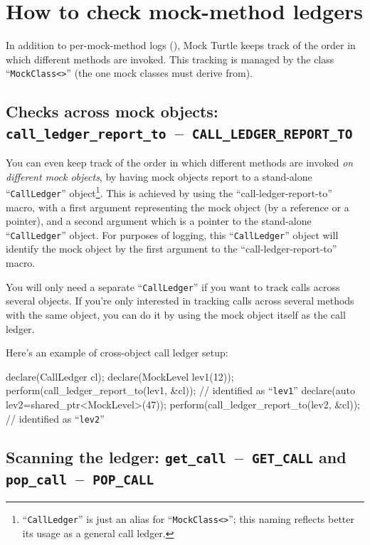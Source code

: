 \documentclass[twoside, a4paper, article]{memoir}
\newcommand*\testudocolor{\color{red!80!blue}}
\newcommand*\testudo[1]{\texttt{\testudocolor{}#1}}
\newcommand*\testudopair[2]{\testudo{#1}~--~\testudo{#2}}
\newcommand\subsectiontestudopair[3]{%
  \subsection[#1]{#1: \testudopair{#2}{#3}}}
\begin{document}
\section{How to check mock-method ledgers}
\label{sec:check-mock-method-ledgers}

In addition to per-mock-method logs (), Mock
Turtle keeps track of the order in which different methods are invoked.  This
tracking is managed by the class ``\texttt{MockClass<>}'' (the one
mock classes must derive from).

\subsectiontestudopair{Checks across mock objects}%
  {call\_ledger\_report\_to}{CALL\_LEDGER\_REPORT\_TO}
\label{sec:check-mock-method-ledgers-across-mock-objects}

You can even keep track of the order in which different methods are invoked
\emph{on different mock objects}, by having mock objects report to a
stand-alone ``\texttt{CallLedger}''
object\footnote{``\texttt{CallLedger}'' is just an alias for
  ``\texttt{MockClass<>}''; this naming reflects better its usage as a
  general call ledger.}.
This is achieved by using the ``call-ledger-report-to'' macro, with a first
argument representing the mock object (by a reference or a pointer), and a
second argument which is a pointer to the stand-alone ``\texttt{CallLedger}''
object.  For purposes of logging, this ``\texttt{CallLedger}'' object will
identify the mock object by the first argument to the ``call-ledger-report-to''
macro.

You will only need a separate ``\texttt{CallLedger}'' if you want to
track calls across several objects.  If you're only interested in tracking
calls across several methods with the same object, you can do it by using the
mock object itself as the call ledger.

Here's an example of cross-object call ledger setup:
\begin{cpplisting}
declare(CallLedger cl);
declare(MockLevel lev1(12));
perform(call_ledger_report_to(lev1, &cl)); // identified as ``\texttt{lev1}''
declare(auto lev2=shared_ptr<MockLevel>(47));
perform(call_ledger_report_to(lev2, &cl)); // identified as ``\texttt{lev2}''
\end{cpplisting}

\subsection[Scanning the ledger]%
  {Scanning the ledger:
    \testudopair{get\_call}{GET\_CALL} and
    \testudopair{pop\_call}{POP\_CALL}}
\label{sec:scan-ledger}
\end{document}

